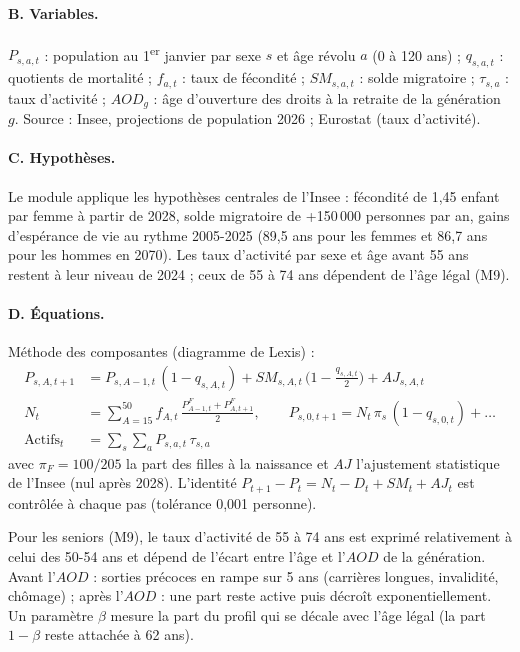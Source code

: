 \paragraph{B. Variables.} $P_{s,a,t}$ : population au 1\textsuperscript{er} janvier par sexe $s$ et âge révolu
$a$ (0 à 120 ans) ; $q_{s,a,t}$ : quotients de mortalité ; $f_{a,t}$ : taux de fécondité ; $SM_{s,a,t}$ : solde
migratoire ; $\tau_{s,a}$ : taux d'activité ; $AOD_g$ : âge d'ouverture des droits à la retraite de la génération $g$.
Source : Insee, projections de population 2026  ; Eurostat  (taux d'activité).

\paragraph{C. Hypothèses.} Le module applique les hypothèses centrales de l'Insee : fécondité de 1,45 enfant par
femme à partir de 2028, solde migratoire de +150\,000 personnes par an, gains d'espérance de vie au rythme 2005-2025
(89,5 ans pour les femmes et 86,7 ans pour les hommes en 2070). Les taux d'activité par sexe et âge avant 55 ans
restent à leur niveau de 2024 ; ceux de 55 à 74 ans dépendent de l'âge légal (M9).

\paragraph{D. Équations.} Méthode des composantes (diagramme de Lexis) :
\begin{align}
P_{s,A,t+1} &= P_{s,A-1,t}\,(1-q_{s,A,t}) + SM_{s,A,t}\,\bigl(1-\tfrac{q_{s,A,t}}{2}\bigr) + AJ_{s,A,t} \\
N_t &= \sum_{A=15}^{50} f_{A,t}\,\frac{P^F_{A-1,t}+P^F_{A,t+1}}{2},\qquad P_{s,0,t+1} = N_t\,\pi_s\,(1-q_{s,0,t})+\dots \\
\text{Actifs}_t &= \sum_{s}\sum_{a} P_{s,a,t}\,\tau_{s,a}
\end{align}
avec $\pi_F = 100/205$ la part des filles à la naissance et $AJ$ l'ajustement statistique de l'Insee (nul après 2028).
L'identité $P_{t+1}-P_t = N_t - D_t + SM_t + AJ_t$ est contrôlée à chaque pas (tolérance 0,001 personne).

Pour les seniors (M9), le taux d'activité de 55 à 74 ans est exprimé relativement à celui des 50-54 ans et dépend de
l'écart entre l'âge et l'$AOD$ de la génération. Avant l'$AOD$ : sorties précoces en rampe sur 5 ans (carrières
longues, invalidité, chômage) ; après l'$AOD$ : une part reste active puis décroît exponentiellement. Un paramètre
$\beta$ mesure la part du profil qui se décale avec l'âge légal (la part $1-\beta$ reste attachée à 62 ans).

